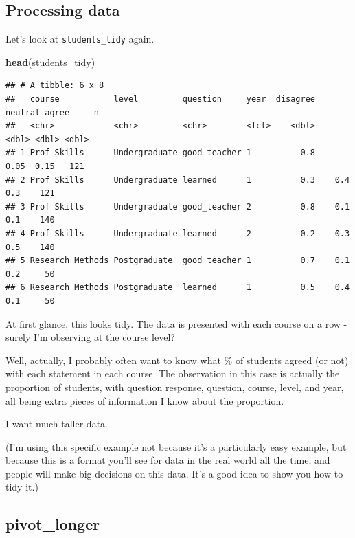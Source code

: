 \documentclass[
]{book}
\newenvironment{Shaded}{\begin{snugshade}}{\end{snugshade}}
\newcommand{\KeywordTok}[1]{\textcolor[rgb]{0.13,0.29,0.53}{\textbf{#1}}}
\newcommand{\NormalTok}[1]{#1}
\begin{document}
\hypertarget{processing-data}{%
\subsection{Processing data}\label{processing-data}}

Let's look at \texttt{students\_tidy} again.

\begin{Shaded}
\begin{Highlighting}[]
\KeywordTok{head}\NormalTok{(students_tidy)}
\end{Highlighting}
\end{Shaded}

\begin{verbatim}
## # A tibble: 6 x 8
##   course           level         question     year  disagree neutral agree     n
##   <chr>            <chr>         <chr>        <fct>    <dbl>   <dbl> <dbl> <dbl>
## 1 Prof Skills      Undergraduate good_teacher 1          0.8    0.05  0.15   121
## 2 Prof Skills      Undergraduate learned      1          0.3    0.4   0.3    121
## 3 Prof Skills      Undergraduate good_teacher 2          0.8    0.1   0.1    140
## 4 Prof Skills      Undergraduate learned      2          0.2    0.3   0.5    140
## 5 Research Methods Postgraduate  good_teacher 1          0.7    0.1   0.2     50
## 6 Research Methods Postgraduate  learned      1          0.5    0.4   0.1     50
\end{verbatim}

At first glance, this looks tidy. The data is presented with each course on a row - surely I'm observing at the course level?

Well, actually, I probably often want to know what \% of students agreed (or not) with each statement in each course. The observation in this case is actually the proportion of students, with question response, question, course, level, and year, all being extra pieces of information I know about the proportion.

I want much taller data.

(I'm using this specific example not because it's a particularly easy example, but because this is a format you'll see for data in the real world all the time, and people will make big decisions on this data. It's a good idea to show you how to tidy it.)

\hypertarget{pivot_longer}{%
\subsection{pivot\_longer}\label{pivot_longer}}
\end{document}
